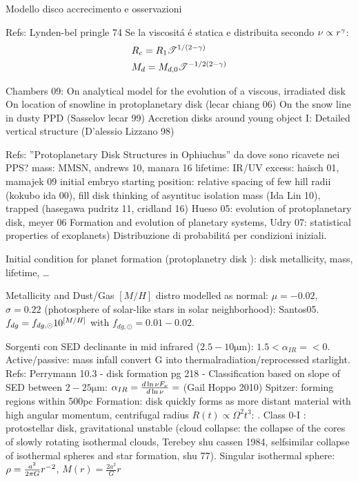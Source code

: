 \begin{reworking}{Modello disco accrecimento e osservazioni}
	\begin{workout}
		Refs: Lynden-bel pringle 74
		Se la viscosit\'a \'e statica e distribuita secondo $\nu\propto r^{\gamma}$:
		\begin{align}
		&R_c=R_1\mathcal{T}^{1/(2-\gamma)}\\
		&M_d=M_{d,0}\mathcal{T}^{-1/2(2-\gamma)}\\
		\end{align}
	\end{workout}
	
	\begin{workout}
		Chambers 09: On analytical model for the evolution of a viscous, irradiated disk
		On location of snowline in protoplanetary disk (lecar chiang 06)
		On the snow line in dusty PPD (Sasselov lecar 99)
		Accretion disks around young object I: Detailed vertical structure (D'alessio Lizzano 98)
	\end{workout}
	
	\begin{workout}
		Refs: ''Protoplanetary Disk Structures in Ophiuchus''
		da dove sono ricavete nei PPS?
		mass: MMSN, andrews 10, manara 16
		lifetime: IR/UV excess: haisch 01, mamajek 09
		initial embryo starting position: relative spacing of few hill radii (kokubo ida 00), fill disk thinking of asyntituc isolation mass (Ida Lin 10), trapped (hasegawa pudritz 11, cridland 16)
		Hueso 05: evolution of protoplanetary disk, meyer 06 Formation and evolution of planetary systems, Udry 07: statistical properties of exoplanets)
		Distribuzione di probabilit\'a per condizioni iniziali.
		
		Initial condition for planet formation (protoplanetry disk \cite{meyer2006formation}): disk metallicity, mass, lifetime, \ldots
		
		{Metallicity and Dust/Gas}
		$[M/H]$ distro modelled as normal: $\mu=-0.02$, $\sigma=0.22$ (photosphere of solar-like stars in solar neighborhood): Santos05.
		$f_{dg}=f_{dg,\odot}10^{[M/H]}$ with $f_{dg,\odot}=0.01-0.02$.
	\end{workout}
	
	\begin{workout}
		Sorgenti con SED declinante in mid infrared ($2.5-10\si{\micro\meter}$): $1.5<\alpha_{IR}=<0$. Active/passive: mass infall convert G into thermalradiation/reprocessed starlight.
		Refs: Perrymann 10.3 - disk formation pg 218 - 
		Classification based on slope of SED between $2-25\si{\micro\meter}$: $\alpha_{IR}=\frac{d \ln{\nu F_{\nu}}}{d \ln{\nu}}=$ (Gail Hoppo 2010)
		Spitzer: forming regions within 500pc
		Formation: disk quickly forms as more distant material with high angular momentum, centrifugal radius $R(t)\propto\Omega^2 t^3$: . Class 0-I : protostellar disk, gravitational unstable (cloud collapse: the collapse of the cores of slowly rotating isothermal clouds, Terebey shu cassen 1984, selfsimilar collapse of isothermal spheres and star formation, shu 77). Singular isothermal sphere: $\rho=\frac{a^2}{2\pi G}r^{-2}$, $M(r)=\frac{2a^2}{G}r$
	\end{workout}
	

\end{reworking}

